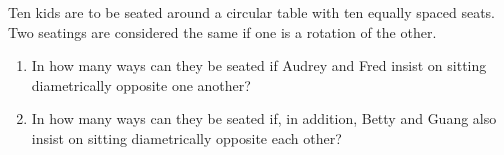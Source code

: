 Ten kids are to be seated around a circular table with ten equally spaced seats. Two seatings are considered the same if one is a rotation of the other.
\begin{enumerate}
\item[(a)] In how many ways can they be seated if Audrey and Fred insist on sitting diametrically opposite one another?
\item[(b)] In how many ways can they be seated if, in addition, Betty and Guang also insist on sitting diametrically opposite each other?
\end{enumerate}
